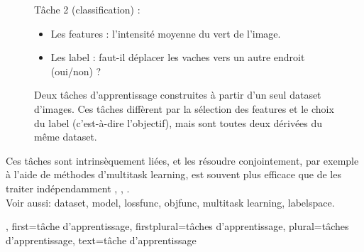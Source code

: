 {{\begin{figure}[H]
			\hfill
			\begin{minipage}[t]{0.45\textwidth}
				Tâche 2 (\gls{classification}) :
				\begin{itemize}
					\item Les \glspl{feature} : l’intensité moyenne du vert de l’image.
					\item Les \gls{label} : faut-il déplacer les vaches vers un autre endroit (oui/non) ?
				\end{itemize}
			\end{minipage}
			\caption{Deux tâches d’apprentissage construites à partir d’un seul \gls{dataset} d’images. 
				Ces tâches diffèrent par la sélection des \glspl{feature} et le choix du \gls{label} (c’est-à-dire l’objectif), 
				mais sont toutes deux dérivées du même \gls{dataset}.}
			\label{fig:learning_tasks_cows_dict}
		\end{figure}
		Ces tâches sont intrinsèquement liées, et les résoudre conjointement, par exemple à l’aide de méthodes d’\gls{multitask learning}, 
		est souvent plus efficace que de les traiter indépendamment 
		\cite{Caruana:1997wk}, \cite{JungGaphLassoSPL}, \cite{CSGraphSelJournal}.
		\\ 
		Voir aussi: \gls{dataset}, \gls{model}, \gls{lossfunc}, \gls{objfunc}, \gls{multitask learning}, \gls{labelspace}.},
	first={tâche d'apprentissage},
	firstplural={tâches d'apprentissage},
	plural={tâches d'apprentissage}, 
	text={tâche d'apprentissage}
}


